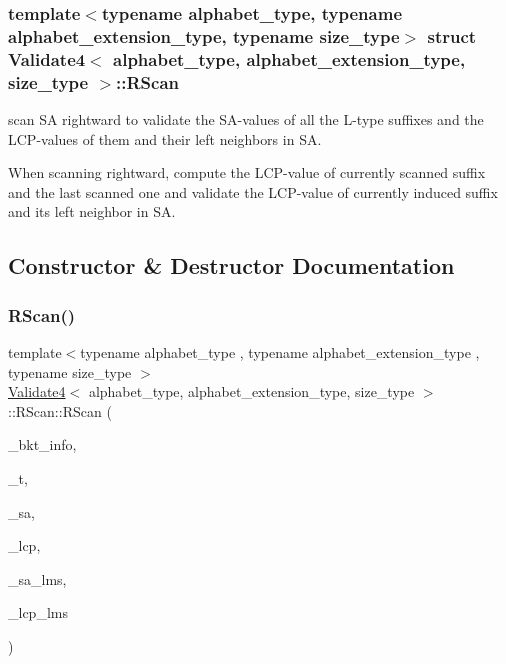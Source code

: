 \subsubsection*{template$<$typename alphabet\+\_\+type, typename alphabet\+\_\+extension\+\_\+type, typename size\+\_\+type$>$\newline
struct Validate4$<$ alphabet\+\_\+type, alphabet\+\_\+extension\+\_\+type, size\+\_\+type $>$\+::\+R\+Scan}

scan SA rightward to validate the S\+A-\/values of all the L-\/type suffixes and the L\+C\+P-\/values of them and their left neighbors in SA. 

When scanning rightward, compute the L\+C\+P-\/value of currently scanned suffix and the last scanned one and validate the L\+C\+P-\/value of currently induced suffix and its left neighbor in SA. 

\subsection{Constructor \& Destructor Documentation}
\mbox{\label{struct_validate4_1_1_r_scan_a278507de57d05bc31a364a632f3a38ab}} 
\subsubsection{\texorpdfstring{R\+Scan()}{RScan()}}
{\footnotesize\ttfamily template$<$typename alphabet\+\_\+type , typename alphabet\+\_\+extension\+\_\+type , typename size\+\_\+type $>$ \\
\hyperlink{class_validate4}{Validate4}$<$ alphabet\+\_\+type, alphabet\+\_\+extension\+\_\+type, size\+\_\+type $>$\+::R\+Scan\+::\+R\+Scan (\begin{DoxyParamCaption}\item[{\hyperlink{struct_validate4_1_1_bkt_info}{Bkt\+Info} \&}]{\+\_\+bkt\+\_\+info,  }\item[{\hyperlink{class_validate4_a49c80b3d101be19542a4341c2387603a}{alphabet\+\_\+vector\+\_\+type} $\ast$}]{\+\_\+t,  }\item[{\hyperlink{class_validate4_a46ea31a0a4b23f583806792160421d15}{size\+\_\+vector\+\_\+type} $\ast$}]{\+\_\+sa,  }\item[{\hyperlink{class_validate4_a46ea31a0a4b23f583806792160421d15}{size\+\_\+vector\+\_\+type} $\ast$}]{\+\_\+lcp,  }\item[{\hyperlink{class_validate4_a46ea31a0a4b23f583806792160421d15}{size\+\_\+vector\+\_\+type} $\ast$}]{\+\_\+sa\+\_\+lms,  }\item[{\hyperlink{class_validate4_a46ea31a0a4b23f583806792160421d15}{size\+\_\+vector\+\_\+type} $\ast$}]{\+\_\+lcp\+\_\+lms }\end{DoxyParamCaption})\hspace{0.3cm}{\ttfamily [inline]}}



